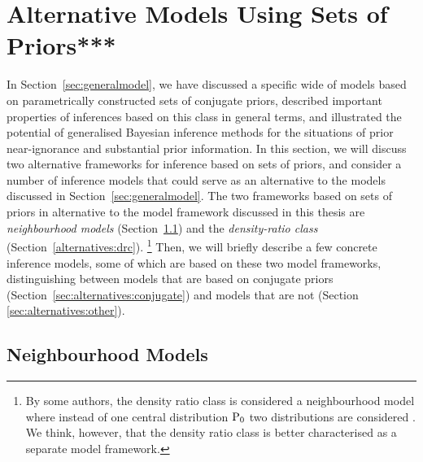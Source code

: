 \section{Alternative Models Using Sets of Priors***}
\label{sec:alternatives}


In Section~\ref{sec:generalmodel},
we have discussed a specific wide of models based on parametrically constructed sets of conjugate priors,
described important properties of inferences based on this class in general terms,
and illustrated the potential of generalised Bayesian inference methods
for the situations of prior near-ignorance and substantial prior information.
In this section, we will discuss two alternative frameworks for inference based on sets of priors,
and consider a number of inference models that could serve as an alternative to the models discussed in Section~\ref{sec:generalmodel}.
The two frameworks based on sets of priors
in alternative to the model framework discussed in this thesis are 
\emph{neighbourhood models} (Section~\ref{sec:alternatives:neighbourhood}) and
the \emph{density-ratio class} (Section~\ref{alternatives:drc}).%
\footnote{By some authors, the density ratio class is considered a neighbourhood model
where instead of one central distribution $\operatorname{P}_0$ two distributions are considered
\parencite[e.g.,][\S 4.3]{1991:pericchi}.
We think, however, that the density ratio class is better characterised as a separate model framework.}
Then, we will briefly describe a few concrete inference models,
some of which are based on these two model frameworks,
distinguishing between models that are based on conjugate priors (Section~\ref{sec:alternatives:conjugate})
and models that are not (Section \ref{sec:alternatives:other}).


\subsection{Neighbourhood Models}
\label{sec:alternatives:neighbourhood}

